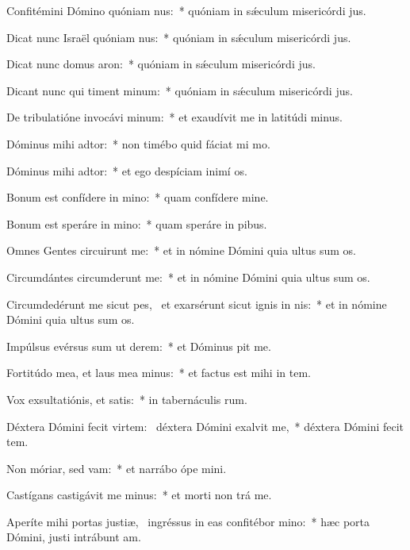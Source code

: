 \item Confitémini Dómino quóniam nus:~* quóniam in sǽculum misericórdi jus.
\item Dicat nunc Israël quóniam nus:~* quóniam in sǽculum misericórdi jus.
\item Dicat nunc domus aron:~* quóniam in sǽculum misericórdi jus.
\item Dicant nunc qui timent minum:~* quóniam in sǽculum misericórdi jus.
\item De tribulatióne invocávi minum:~* et exaudívit me in latitúdi minus.
\item Dóminus mihi adtor:~* non timébo quid fáciat mi mo.
\item Dóminus mihi adtor:~* et ego despíciam inimí os.
\item Bonum est confídere in mino:~* quam confídere  mine.
\item Bonum est speráre in mino:~* quam speráre in pibus.
\item Omnes Gentes circuirunt me:~* et in nómine Dómini quia ultus sum  os.
\item Circumdántes circumderunt me:~* et in nómine Dómini quia ultus sum  os.
\item Circumdedérunt me sicut pes,~\pscross{} et exarsérunt sicut ignis in nis:~* et in nómine Dómini quia ultus sum  os.
\item Impúlsus evérsus sum ut derem:~* et Dóminus pit me.
\item Fortitúdo mea, et laus mea minus:~* et factus est mihi in tem.
\item Vox exsultatiónis, et satis:~* in tabernáculis rum.
\item Déxtera Dómini fecit virtem:~\pscross{} déxtera Dómini exalvit me,~* déxtera Dómini fecit tem.
\item Non móriar, sed vam:~* et narrábo ópe mini.
\item Castígans castigávit me minus:~* et morti non trá me.
\item Aperíte mihi portas justiæ,~\pscross{} ingréssus in eas confitébor mino:~* hæc porta Dómini, justi intrábunt  am.
